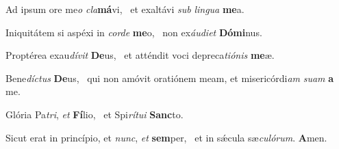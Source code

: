 \item Ad ipsum ore me\textit{o} \textit{cla}\textbf{má}vi,~\psstar{} et exaltávi \textit{sub} \textit{lingua} \textbf{me}a.
\item Iniquitátem si aspéxi in \textit{corde} \textbf{me}o,~\psstar{} non ex\textit{áudiet} \textbf{Dó}\textbf{mi}nus.
\item Proptérea exau\textit{dívit} \textbf{De}us,~\psstar{} et atténdit voci depreca\textit{tiónis} \textbf{me}æ.
\item Bene\textit{díctus} \textbf{De}us,~\psstar{} qui non amóvit oratiónem meam, et misericórdi\textit{am} \textit{suam} \textbf{a} me.
\item Glória Pa\textit{tri}, \textit{et} \textbf{Fí}lio,~\psstar{} et Spi\textit{rítui} \textbf{Sanc}to.
\item Sicut erat in princípio, et \textit{nunc}, \textit{et} \textbf{sem}per,~\psstar{} et in sǽcula sæ\textit{culórum}. \textbf{A}men.
